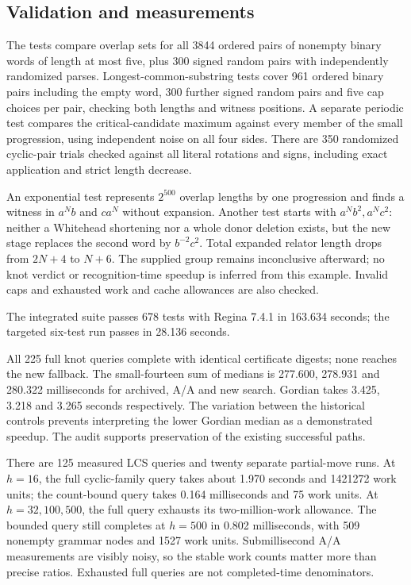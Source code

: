 \subsection{Validation and measurements}

The tests compare overlap sets for all 3844 ordered pairs of nonempty binary
words of length at most five, plus 300 signed random pairs with independently
randomized parses. Longest-common-substring tests cover 961 ordered binary
pairs including the empty word, 300 further signed random pairs and five
cap choices per pair, checking both lengths and witness positions. A
separate periodic test compares the critical-candidate maximum against every
member of the small progression, using independent noise on all four sides.
There are 350 randomized cyclic-pair trials checked against all literal
rotations and signs, including exact application and strict length decrease.

An exponential test represents $2^{500}$ overlap lengths by one progression
and finds a witness in $a^N b$ and $c a^N$ without expansion. Another test
starts with $a^N b^2,a^N c^2$: neither a Whitehead shortening nor a whole
donor deletion exists, but the new stage replaces the second word by
$b^{-2}c^2$. Total expanded relator length drops from $2N+4$ to $N+6$.
The supplied group remains inconclusive afterward; no knot verdict or
recognition-time speedup is inferred from this example. Invalid caps and
exhausted work and cache allowances are also checked.

The integrated suite passes 678 tests with Regina 7.4.1 in 163.634 seconds;
the targeted six-test run passes in 28.136 seconds.



All 225 full knot queries complete with identical certificate digests; none
reaches the new fallback. The small-fourteen sum of medians is 277.600,
278.931 and 280.322 milliseconds for archived, A/A and new search.
Gordian takes 3.425, 3.218 and 3.265 seconds respectively. The variation
between the historical controls prevents interpreting the lower Gordian
median as a demonstrated speedup. The audit supports preservation of the
existing successful paths.



There are 125 measured LCS queries and twenty separate partial-move runs.
At $h=16$, the full cyclic-family query takes about 1.970 seconds and
1421272 work units; the count-bound query takes 0.164 milliseconds and
75 work units. At $h=32,100,500$, the full query exhausts its two-million-work
allowance. The bounded query still completes at $h=500$ in 0.802 milliseconds,
with 509 nonempty grammar nodes and 1527 work units. Submillisecond A/A
measurements are visibly noisy, so the stable work counts matter more than
precise ratios. Exhausted full queries are not completed-time denominators.


